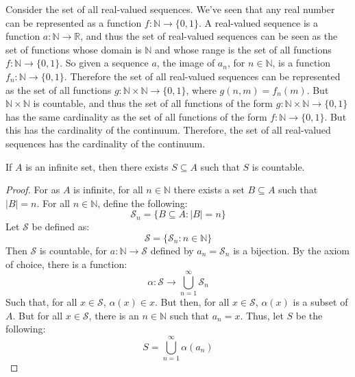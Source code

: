     \begin{lexample}
        Consider the set of all real-valued sequences. We've seen
        that any real number can be represented as a function
        $f:\mathbb{N}\rightarrow\{0,1\}$. A real-valued sequence
        is a function $a:\mathbb{N}\rightarrow\mathbb{R}$, and
        thus the set of real-valued sequences can be seen as the
        set of functions whose domain is $\mathbb{N}$ and whose
        range is the set of all functions
        $f:\mathbb{N}\rightarrow\{0,1\}$. So given a sequence
        $a$, the image of $a_{n}$, for $n\in\mathbb{N}$, is a
        function $f_{n}:\mathbb{N}\rightarrow\{0,1\}$. Therefore
        the set of all real-valued sequences can be represented
        as the set of all functions
        $g:\mathbb{N}\times\mathbb{N}\rightarrow\{0,1\}$, where
        $g(n,m)=f_{n}(m)$. But $\mathbb{N}\times\mathbb{N}$ is
        countable, and thus the set of all functions of the form
        $g:\mathbb{N}\times\mathbb{N}\rightarrow\{0,1\}$ has the
        same cardinality as the set of all functions of the form
        $f:\mathbb{N}\rightarrow\{0,1\}$. But this has the
        cardinality of the continuum. Therefore, the set of all
        real-valued sequences has the cardinality of the continuum.
    \end{lexample}
    \begin{theorem}
        If $A$ is an infinite set, then there exists $S\subseteq{A}$ such that
        $S$ is countable.
    \end{theorem}
    \begin{proof}
        For as $A$ is infinite, for all $n\in\mathbb{N}$
        there exists a set $B\subseteq{A}$ such that
        $|B|=n$. For all $n\in\mathbb{N}$,
        define the following:
        \begin{equation}
            \mathcal{S}_{n}=\{B\subseteq{A}:|B|=n\}
        \end{equation}
        Let $\mathcal{S}$ be defined as:
        \begin{equation}
            \mathcal{S}=\{\mathcal{S}_{n}:n\in\mathbb{N}\}
        \end{equation}
        Then $\mathcal{S}$ is countable, for
        $a:\mathbb{N}\rightarrow\mathcal{S}$ defined
        by $a_{n}=\mathcal{S}_{n}$ is a bijection.
        By the axiom of choice, there is a function:
        \begin{equation}
            \alpha:\mathcal{S}\rightarrow
            \bigcup_{n=1}^{\infty}\mathcal{S}_{n}
        \end{equation}
        Such that, for all $x\in\mathcal{S}$,
        $\alpha(x)\in{x}$. But then, for all
        $x\in\mathcal{S}$, $\alpha(x)$ is a subset
        of $A$. But for all $x\in\mathcal{S}$, there
        is an $n\in\mathbb{N}$ such that
        $a_{n}=x$. Thus, let $S$ be the following:
        \begin{equation}
            S=\bigcup_{n=1}^{\infty}\alpha(a_{n})
        \end{equation}
    \end{proof}

